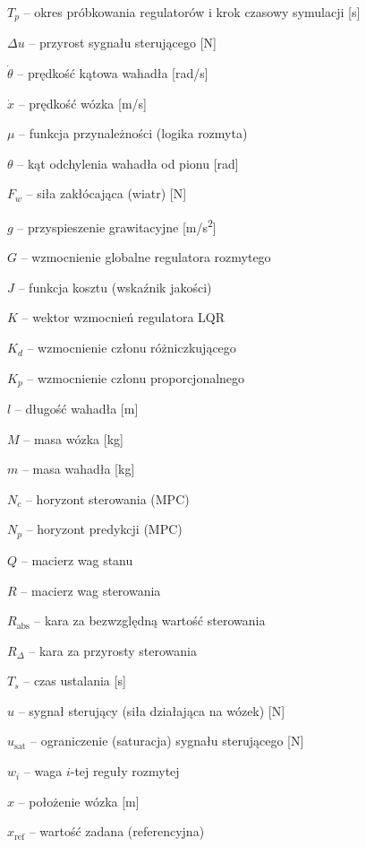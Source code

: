 \documentclass[
    left=2.5cm,         %
    right=2.5cm,        %
    top=2.5cm,          %
    bottom=3cm,         %
    bindingoffset=6mm,  %
    nohyphenation=false %
]{eiti/eiti-thesis}
\begin{document}

\newpage 

\newpage

\newpage

\newpage

\newpage

\newpage


\cleardoublepage %
\printbibliography

\newpage
\pagestyle{plain}

\vspace{0.8cm}
\renewcommand{\acronym}[2]{%
    \par\noindent\hspace{0.4em}%
    {#1 -- #2}%
}
\acronymlist

\acronym{$T_p$}{okres próbkowania regulatorów i krok czasowy symulacji [s]}
\acronym{$\Delta u$}{przyrost sygnału sterującego [N]}
\acronym{$\dot{\theta}$}{prędkość kątowa wahadła [rad/s]}
\acronym{$\dot{x}$}{prędkość wózka [m/s]}
\acronym{$\mu$}{funkcja przynależności (logika rozmyta)}
\acronym{$\theta$}{kąt odchylenia wahadła od pionu [rad]}
\acronym{$F_w$}{siła zakłócająca (wiatr) [N]}
\acronym{$g$}{przyspieszenie grawitacyjne [m/s\textsuperscript{2}]}
\acronym{$G$}{wzmocnienie globalne regulatora rozmytego}
\acronym{$J$}{funkcja kosztu (wskaźnik jakości)}
\acronym{$K$}{wektor wzmocnień regulatora LQR}
\acronym{$K_d$}{wzmocnienie członu różniczkującego}
\acronym{$K_p$}{wzmocnienie członu proporcjonalnego}
\acronym{$l$}{długość wahadła [m]}
\acronym{$M$}{masa wózka [kg]}
\acronym{$m$}{masa wahadła [kg]}
\acronym{$N_c$}{horyzont sterowania (MPC)}
\acronym{$N_p$}{horyzont predykcji (MPC)}
\acronym{$Q$}{macierz wag stanu}
\acronym{$R$}{macierz wag sterowania}
\acronym{$R_{\mathrm{abs}}$}{kara za bezwzględną wartość sterowania}
\acronym{$R_{\Delta}$}{kara za przyrosty sterowania}
\acronym{$T_s$}{czas ustalania [s]}
\acronym{$u$}{sygnał sterujący (siła działająca na wózek) [N]}
\acronym{$u_{\mathrm{sat}}$}{ograniczenie (saturacja) sygnału sterującego [N]}
\acronym{$w_i$}{waga $i$-tej reguły rozmytej}
\acronym{$x$}{położenie wózka [m]}
\acronym{$x_{\mathrm{ref}}$}{wartość zadana (referencyjna)}
\end{document}
